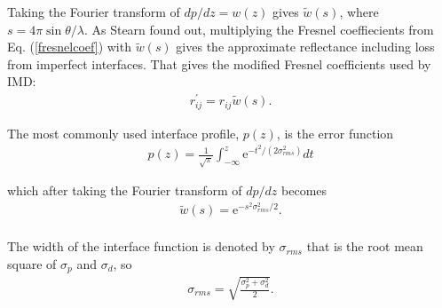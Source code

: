 Taking the Fourier transform of $dp/dz=w(z)$ gives $\tilde{w}(s)$, where $s = 4 \pi \sin{\theta}/\lambda$. As Stearn found out, multiplying the Fresnel coeffiecients from Eq. (\ref{fresnelcoef}) with $\tilde{w}(s)$ gives the approximate reflectance including loss from imperfect interfaces. That gives the modified Fresnel coefficients used by IMD:
\begin{eqnarray}
	r_{ij}^{'} = r_{ij} \tilde{w}(s).
\end{eqnarray}

The most commonly used interface profile, $p(z)$, is the error function
\begin{eqnarray}
	p(z) = \frac{1}{\sqrt{\pi}}\int_{-\infty}^z \mathrm{e}^{-t^2/(2\sigma_{rms}^{2})}dt
\end{eqnarray}

which after taking the Fourier transform of $dp/dz$ becomes
\begin{eqnarray}\label{interfacefunction}
	\tilde{w}(s) = \mathrm{e}^{-s^2\sigma_{rms}^2/2}.
\end{eqnarray}\\

The width of the interface function is denoted by $\sigma_{rms}$ that is the root mean square of $\sigma_p$ and $\sigma_d$, so
\begin{eqnarray}
	\sigma_{rms} = \sqrt{\frac{\sigma_p^2 + \sigma_d^2}{2}}.
\end{eqnarray}

